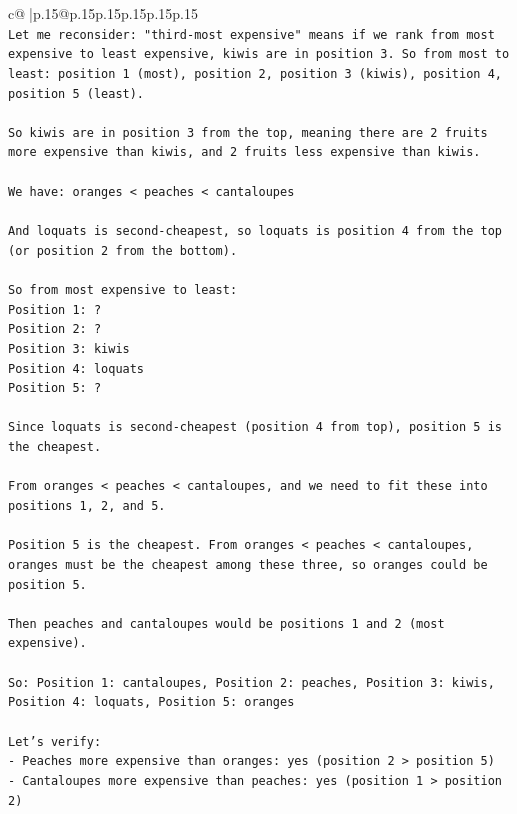 \documentclass{article}
\begin{document}
{\begin{supertabular}{c@{$\;$}|p{.15\linewidth}@{}p{.15\linewidth}p{.15\linewidth}p{.15\linewidth}p{.15\linewidth}p{.15\linewidth}}
{{{\\ 
\texttt{Let me reconsider: "third{-}most expensive" means if we rank from most expensive to least expensive, kiwis are in position 3. So from most to least: position 1 (most), position 2, position 3 (kiwis), position 4, position 5 (least).} \\
\\ 
\texttt{So kiwis are in position 3 from the top, meaning there are 2 fruits more expensive than kiwis, and 2 fruits less expensive than kiwis.} \\
\\ 
\texttt{We have: oranges < peaches < cantaloupes} \\
\\ 
\texttt{And loquats is second{-}cheapest, so loquats is position 4 from the top (or position 2 from the bottom).} \\
\\ 
\texttt{So from most expensive to least:} \\
\texttt{Position 1: ?} \\
\texttt{Position 2: ?} \\
\texttt{Position 3: kiwis} \\
\texttt{Position 4: loquats} \\
\texttt{Position 5: ?} \\
\\ 
\texttt{Since loquats is second{-}cheapest (position 4 from top), position 5 is the cheapest.} \\
\\ 
\texttt{From oranges < peaches < cantaloupes, and we need to fit these into positions 1, 2, and 5.} \\
\\ 
\texttt{Position 5 is the cheapest. From oranges < peaches < cantaloupes, oranges must be the cheapest among these three, so oranges could be position 5.} \\
\\ 
\texttt{Then peaches and cantaloupes would be positions 1 and 2 (most expensive).} \\
\\ 
\texttt{So: Position 1: cantaloupes, Position 2: peaches, Position 3: kiwis, Position 4: loquats, Position 5: oranges} \\
\\ 
\texttt{Let's verify:} \\
\texttt{{-} Peaches more expensive than oranges: yes (position 2 > position 5)} \\
\texttt{{-} Cantaloupes more expensive than peaches: yes (position 1 > position 2)} \\
}}}
\end{supertabular}}
\end{document}

